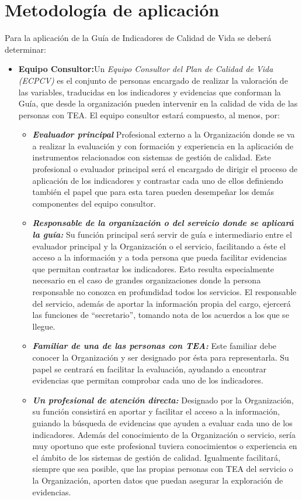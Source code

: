 \section{Metodología de aplicación}
Para la aplicación de la Guía de Indicadores de Calidad de Vida se deberá
determinar:
\begin{itemize}
	\item \textbf{Equipo Consultor:}Un \textit{Equipo Consultor del Plan de Calidad de Vida (ECPCV)} es el
	conjunto de personas encargado de realizar la valoración de las variables, traducidas en
	los indicadores y evidencias que conforman la Guía, que desde la organización
	pueden intervenir en la calidad de vida de las personas con TEA.
	El equipo consultor estará compuesto, al menos, por:
	\begin{itemize}
		\item \textbf{\textit{Evaluador principal}}
		Profesional externo a la Organización donde se va a realizar la
		evaluación y con formación y experiencia en la aplicación de
		instrumentos relacionados con sistemas de gestión de calidad. Este
		profesional o evaluador principal será el encargado de dirigir el proceso
		de aplicación de los indicadores y contrastar cada uno de ellos
		definiendo también el papel que para esta tarea pueden desempeñar los
		demás componentes del equipo consultor.
		\item \textbf{\textit{Responsable de la organización o del servicio donde se aplicará la
		guía: }}
		Su función principal será servir de guía e intermediario entre el evaluador
		principal y la Organización o el servicio, facilitando a éste el acceso a la
		información y a toda persona que pueda facilitar evidencias que permitan
		contrastar los indicadores. Esto resulta especialmente necesario en el
		caso de grandes organizaciones donde la persona responsable no
		conozca en profundidad todos los servicios.
		El responsable del servicio, además de aportar la información propia del
		cargo, ejercerá las funciones de “secretario”, tomando nota de los
		acuerdos a los que se llegue.

		\item \textbf{\textit{Familiar de una de las personas con TEA: }}
		Este familiar debe conocer la Organización y ser designado por ésta
		para representarla. Su papel se centrará en facilitar la evaluación,
		ayudando a encontrar evidencias que permitan comprobar cada uno de
		los indicadores.
		\item \textbf{\textit{Un profesional de atención directa: }}
		Designado por la Organización, su función consistirá en aportar y facilitar
		el acceso a la información, guiando la búsqueda de evidencias que
		ayuden a evaluar cada uno de los indicadores. Además del conocimiento
		de la Organización o servicio, sería muy oportuno que este profesional
		tuviera conocimientos o experiencia en el ámbito de los sistemas de
		gestión de calidad.
		Igualmente facilitará, siempre que sea posible, que las propias personas
		con TEA del servicio o la Organización, aporten datos que puedan
		asegurar la exploración de evidencias.
	\end{itemize}
	

\end{itemize}
